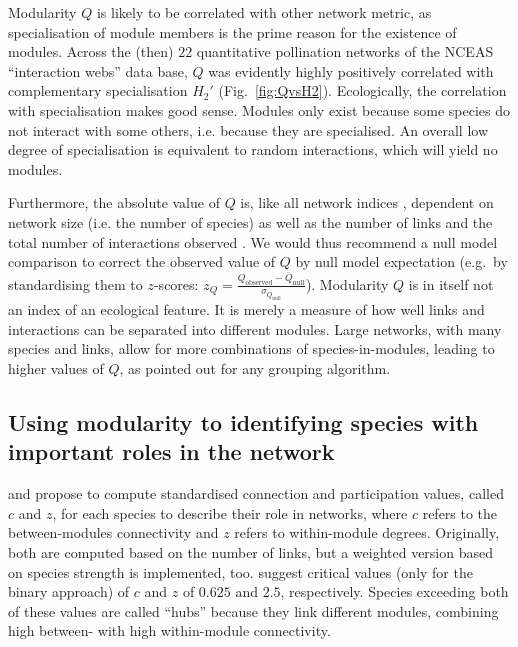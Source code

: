 \documentclass[a4paper, 11pt]{article}\usepackage[]{graphicx}\usepackage[]{color}
\begin{document}
Modularity $Q$ is likely to be correlated with other network metric, as specialisation of module members is the prime reason for the existence of modules. Across the (then) $22$ quantitative pollination networks of the NCEAS ``interaction webs'' data base, %
 $Q$ was evidently highly positively correlated with complementary specialisation $H_2'$ (Fig.~\ref{fig:QvsH2}).
Ecologically, the correlation with specialisation makes good sense. Modules only exist because some species do not interact with some others, i.e. because they are specialised. An overall low degree of specialisation is equivalent to random interactions, which will yield no modules. %

Furthermore, the absolute value of $Q$ is, like all network indices \citep{Dormann2009}, dependent on network size (i.e. the number of species) as well as the number of links and the total number of interactions observed \citep{Thebault2013}. We would thus recommend a null model comparison \citep{Vazquez2003a,Bluthgen2008,Dormann2009} to correct the observed value of $Q$ by null model expectation (e.g.~by standardising them to $z$-scores:
$z_{Q} = \frac{Q_{\text{observed}} - \overline{Q}_{\text{null}}}{\sigma_{Q_{\text{null}}}}$).
%
Modularity $Q$ is in itself not an index of an ecological feature. It is merely a measure of how well links and interactions can be separated into different modules. Large networks, with many species and links, allow for more combinations of species-in-modules, leading to higher values of $Q$, as \citet{Allesina2009a} pointed out for any grouping algorithm. %


\subsection{Using modularity to identifying species with important roles in the network}
\citet{Guimera2005} and \citet{Olesen2007} propose to compute standardised connection and participation values, called $c$ and $z$, for each species to describe their role in networks, where $c$ refers to the between-modules connectivity \citep[called ``participation coefficient'' $P$:][]{Guimera2005} and $z$ refers to within-module degrees. Originally, both are computed based on the number of links, but a weighted version based on species strength is implemented, too. \citet{Guimera2005} suggest critical values (only for the binary approach) of $c$ and $z$ of $0.625$ and $2.5$, respectively. Species exceeding both of these values are called ``hubs'' because they link different modules, combining high between- with high within-module connectivity. 
\end{document}
